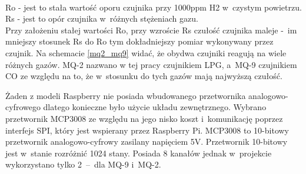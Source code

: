 \\Ro - jest to stała wartość oporu czujnika przy 1000ppm H2 w~czystym powietrzu.\\
Rs - jest to opór czujnika w~różnych stężeniach gazu. \\
Przy założeniu stałej wartości Ro, przy wzroście Rs czułość czujnika maleje -~im mniejszy stosunek Rs do Ro tym dokładniejszy pomiar wykonywany przez czujnik. Na schemacie \ref{mq2_mq9} widać, że obydwa czujniki reagują na wiele różnych gazów. MQ-2 nazwano w tej pracy czujnikiem LPG, a~MQ-9 czujnikiem CO ze względu na to, że w~stosunku do tych gazów mają najwyższą czułość. 

Żaden z modeli Raspberry nie posiada wbudowanego przetwornika analogowo-cyfrowego dlatego konieczne było użycie układu zewnętrznego. Wybrano przetwornik MCP3008 ze względu na jego nisko koszt i~komunikację poprzez interfejs SPI, który jest wspierany przez Raspberry Pi. MCP3008 to 10-bitowy przetwornik analogowo-cyfrowy zasilany napięciem 5V.  Przetwornik 10-bitowy jest w~stanie rozróżnić 1024 stany. Posiada 8 kanałów jednak w~projekcie wykorzystano tylko 2~–~dla MQ-9 i~MQ-2.
